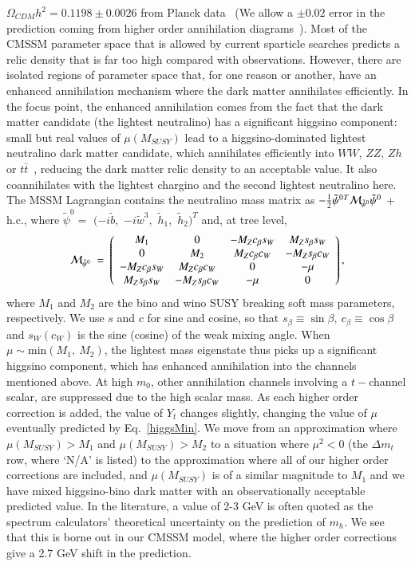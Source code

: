 \documentclass[final,3p,times,pdflatex]{elsarticle}
\begin{document}
$\Omega_{CDM} h^2=0.1198 \pm 0.0026$ from Planck data~\cite{Ade:2013zuv} (We
allow a $\pm 0.02$ error in the prediction coming from higher order
annihilation diagrams~\cite{Baro:2009na}).
Most of the CMSSM parameter space that is allowed by current sparticle
searches predicts a relic density that is far too high compared with
observations. However, there are isolated regions of parameter space that, for
one reason or another, have an enhanced annihilation mechanism where the dark
matter annihilates efficiently. In the focus point, the enhanced annihilation
comes from the fact that the dark matter candidate (the lightest neutralino)
has a significant higgsino component: small but real
values of $\mu(M_{SUSY})$ lead to a higgsino-dominated lightest neutralino dark
matter candidate, which annihilates efficiently into $WW$, $ZZ$, $Zh$ or $t
\bar t$~\cite{Feng:2000gh}, reducing the dark matter relic density to an
acceptable value. It also coannihilates with the lightest chargino and the
second lightest neutralino here. 
The MSSM Lagrangian contains the neutralino mass matrix as
$-\frac{1}{2}
{\tilde\psi^0}{}^T{\cal M}_{\tilde\psi^0}\tilde\psi^0$ + h.c., where
$\tilde\psi^0 =$ $(-i\tilde b,$ $-i\tilde w^3,$ $\tilde h_1,$ $\tilde
h_2)^T$ and, at tree level,
%
\begin{equation}
{\cal M}_{\tilde\psi^0} \ =\ \left(\begin{array}{cccc} M_1 & 0 &
-M_Zc_\beta s_W & M_Zs_\beta s_W \\ 0 & M_2 & M_Zc_\beta c_W &
-M_Zs_\beta c_W \\ -M_Zc_\beta s_W & M_Zc_\beta c_W & 0 & -\mu \\
M_Zs_\beta s_W & -M_Zs_\beta c_W & -\mu & 0
\end{array} \right),\label{mchi0}
\end{equation}
%
where $M_1$ and $M_2$ are the bino and wino SUSY breaking soft mass
parameters, respectively.
We use $s$ and $c$ for sine and cosine, so that
$s_\beta\equiv\sin\beta,\ c_{\beta}\equiv\cos\beta$ and $s_W (c_W)$ is
the sine (cosine) of the weak mixing angle. When $\mu \sim \text{min}(M_1,\
M_2)$, 
the lightest mass eigenstate thus picks up a significant higgsino component, 
which has enhanced annihilation into the channels mentioned above. At high
$m_0$, other annihilation channels involving a $t-$channel scalar, are 
suppressed due to the high scalar mass. 
As each higher order correction is added, the value of $Y_t$ changes slightly,
changing the value of $\mu$ eventually predicted by Eq.~\ref{higgsMin}. 
We move from an approximation where $\mu(M_{SUSY}) > M_1$ and $\mu(M_{SUSY}) >
M_2$ to a situation where $\mu^2<0$ (the $\Delta m_t$ row, where `N/A' is
listed) to the approximation where all of our higher order corrections are
included, and $\mu(M_{SUSY})$ is of a similar magnitude to $M_1$ and
we have mixed 
higgsino-bino dark matter with an observationally acceptable predicted value.
In the literature,  a value of 2-3 GeV is often quoted as the spectrum
calculators' theoretical uncertainty on the prediction of $m_h$. We see that
this is borne out in our CMSSM model, where the higher order corrections give
a 2.7 GeV shift in the prediction.
\end{document}

